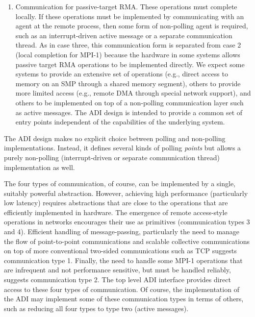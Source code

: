 \begin{enumerate}
\item Communication for passive-target RMA.  These operations
must complete locally.  If these operations must be implemented by
communicating with an agent at the remote process, then some form of
non-polling agent is required, such as an interrupt-driven active
message or a separate communication thread.  As in case three, this
communication form is separated from case 2 (local completion for
MPI-1) because the hardware in some systems allows passive target RMA
operations to be implemented directly.  We expect some systems to
provide an extensive set of operations (e.g., direct access to memory
on an SMP through a shared memory segment), others to provide more
limited access (e.g., remote DMA through special network support), and
others to be implemented on top of a non-polling communication layer
such as active messages.  The ADI design is intended to provide a
common set of entry points independent of the capabilities of the
underlying system.

\end{enumerate}

The ADI design makes no explicit choice between polling and
non-polling implementations.  Instead, it defines several kinds of
polling \emph{points} but allows a purely non-polling
(interrupt-driven or separate communication thread) implementation as well.

The four types of communication, of course, can be implemented by a
single, suitably powerful abstraction.  However, achieving high
performance (particularly low latency) requires abstractions that are
close to the operations that are efficiently implemented in hardware.
The emergence of remote access-style operations in networks
\cite{unet,via,infiniband} encourages their use as primitives
(communication types 3 and 4).  Efficient handling of message-passing,
particularly the need to manage the flow of point-to-point
communications and scalable collective communications on top of more
conventional two-sided communications such as TCP suggests
communication type 1.  Finally, the need to handle some MPI-1
operations that are infrequent and not performance sensitive, but must
be handled reliably, suggests communication type 2.  The top level ADI
interface provides direct access to these four types of communication.  Of
course, the implementation of the ADI may implement some of these
communication types in terms of others, such as reducing all four types to
type two (active messages).  

